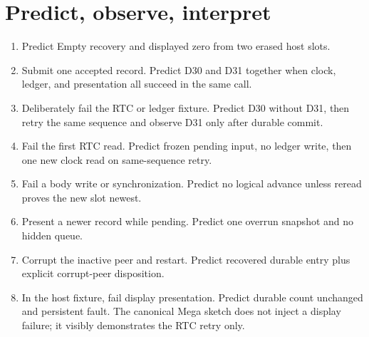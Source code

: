 \documentclass[11pt]{article}
\begin{document}
\section{Predict, observe, interpret}
\begin{enumerate}
 \item Predict Empty recovery and displayed zero from two erased host slots.
 \item Submit one accepted record. Predict D30 and D31 together when clock,
       ledger, and presentation all succeed in the same call.
 \item Deliberately fail the RTC or ledger fixture. Predict D30 without D31,
       then retry the same sequence and observe D31 only after durable commit.
 \item Fail the first RTC read. Predict frozen pending input, no ledger write,
       then one new clock read on same-sequence retry.
 \item Fail a body write or synchronization. Predict no logical advance unless
       reread proves the new slot newest.
 \item Present a newer record while pending. Predict one overrun snapshot and
       no hidden queue.
 \item Corrupt the inactive peer and restart. Predict recovered durable entry
       plus explicit corrupt-peer disposition.
 \item In the host fixture, fail display presentation. Predict durable count
       unchanged and persistent fault. The canonical Mega sketch does not
       inject a display failure; it visibly demonstrates the RTC retry only.
\end{enumerate}
\end{document}
